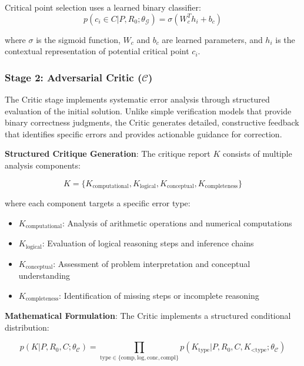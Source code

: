 \documentclass[10pt,twocolumn]{article}
\newcommand{\Generator}{\mathcal{G}}
\newcommand{\Critic}{\mathcal{C}}
\begin{document}
Critical point selection uses a learned binary classifier:
\begin{equation}
p(c_i \in C | P, R_0; \theta_\Generator) = \sigma(W_c^T h_i + b_c)
\end{equation}

where $\sigma$ is the sigmoid function, $W_c$ and $b_c$ are learned parameters, and $h_i$ is the contextual representation of potential critical point $c_i$.

\subsubsection{Stage 2: Adversarial Critic ($\Critic$)}

The Critic stage implements systematic error analysis through structured evaluation of the initial solution. Unlike simple verification models that provide binary correctness judgments, the Critic generates detailed, constructive feedback that identifies specific errors and provides actionable guidance for correction.

\textbf{Structured Critique Generation}: The critique report $K$ consists of multiple analysis components:

\begin{equation}
K = \{K_{\text{computational}}, K_{\text{logical}}, K_{\text{conceptual}}, K_{\text{completeness}}\}
\end{equation}

where each component targets a specific error type:
\begin{itemize}[leftmargin=*]
\item $K_{\text{computational}}$: Analysis of arithmetic operations and numerical computations
\item $K_{\text{logical}}$: Evaluation of logical reasoning steps and inference chains
\item $K_{\text{conceptual}}$: Assessment of problem interpretation and conceptual understanding
\item $K_{\text{completeness}}$: Identification of missing steps or incomplete reasoning
\end{itemize}

\textbf{Mathematical Formulation}: The Critic implements a structured conditional distribution:

\begin{equation}
p(K | P, R_0, C; \theta_\Critic) = \prod_{\text{type} \in \{\text{comp}, \text{log}, \text{conc}, \text{compl}\}} p(K_{\text{type}} | P, R_0, C, K_{<\text{type}}; \theta_\Critic)
\end{equation}
\end{document}
